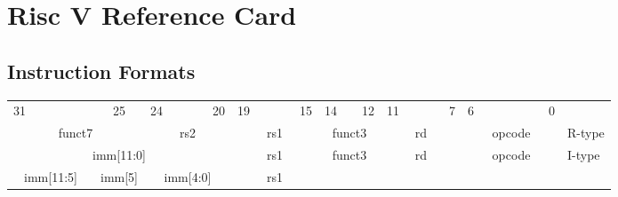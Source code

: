 \vspace*{-2cm}
\section*{Risc V Reference Card}

\subsection*{Instruction Formats}
    \begin{table}[h]
        \scriptsize
        \begin{tabular} %
            {p{0.01mm}p{0.01mm}p{0.01mm}p{0.01mm} p{0.01mm}p{0.01mm}p{0.01mm}p{0.01mm}
             p{0.01mm}p{0.01mm}p{0.01mm}p{0.01mm} p{0.01mm}p{0.01mm}p{0.01mm}p{0.01mm}
             p{0.01mm}p{0.01mm}p{0.01mm}p{0.01mm} p{0.01mm}p{0.01mm}p{0.01mm}p{0.01mm}
             p{0.01mm}p{0.01mm}p{0.01mm}p{0.01mm} p{0.01mm}p{0.01mm}p{0.01mm}p{0.01mm} l}
            \multicolumn{1}{c}{31}&&&&&&
            \multicolumn{1}{c}{25}&
            \multicolumn{1}{c}{24}&&&&
            \multicolumn{1}{c}{20}&
            \multicolumn{1}{c}{19}&&&&
            \multicolumn{1}{c}{15}&
            \multicolumn{1}{c}{14}&&
            \multicolumn{1}{c}{12}&
            \multicolumn{1}{c}{11}&&&&
            \multicolumn{1}{c}{7}&
            \multicolumn{1}{c}{6}&&&&&&
            \multicolumn{1}{c}{0}&
            \\
            \cline{0-31} 
            \multicolumn{7}{|c|}{funct7} &
            \multicolumn{5}{c|}{rs2}&
            \multicolumn{5}{c|}{rs1}&
            \multicolumn{3}{c|}{funct3}&
            \multicolumn{5}{c|}{rd}&
            \multicolumn{7}{c|}{opcode}&
            R-type
            \\
            \cline{0-31} 
            \multicolumn{12}{|c|}{imm[11:0]} &
            \multicolumn{5}{c|}{rs1}&
            \multicolumn{3}{c|}{funct3}&
            \multicolumn{5}{c|}{rd}&
            \multicolumn{7}{c|}{opcode}&
            I-type
            \\
            \cline{0-31} 
            \multicolumn{6}{|c|}{imm[11:5]} &
            \multicolumn{1}{|c|}{imm[5]} &
            \multicolumn{5}{c|}{imm[4:0]}&
            \multicolumn{5}{c|}{rs1}&

\end{tabular}
\end{table}
